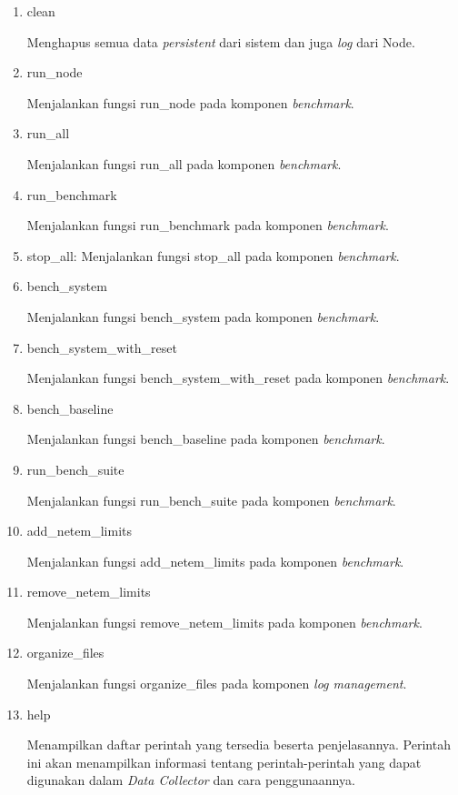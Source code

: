 \begin{enumerate}
  \item clean
  
  Menghapus semua data \textit{persistent} dari sistem dan juga \textit{log} dari Node.
  
  \item run\_node
  
  Menjalankan fungsi run\_node pada komponen \textit{benchmark}.
  
  \item run\_all
  
  Menjalankan fungsi run\_all pada komponen \textit{benchmark}.
  
  \item run\_benchmark
  
  Menjalankan fungsi run\_benchmark pada komponen \textit{benchmark}.
  
  \item stop\_all: Menjalankan fungsi stop\_all pada komponen \textit{benchmark}.
  
  \item bench\_system
  
  Menjalankan fungsi bench\_system pada komponen \textit{benchmark}.
  
  
  \item bench\_system\_with\_reset
  
  Menjalankan fungsi bench\_system\_with\_reset pada komponen \textit{benchmark}.
  
  \item bench\_baseline
  
  Menjalankan fungsi bench\_baseline pada komponen \textit{benchmark}.
  
  \item run\_bench\_suite
  
  Menjalankan fungsi run\_bench\_suite pada komponen \textit{benchmark}.
  
  \item add\_netem\_limits
  
  Menjalankan fungsi add\_netem\_limits pada komponen \textit{benchmark}.
  
  \item remove\_netem\_limits
  
  Menjalankan fungsi remove\_netem\_limits pada komponen \textit{benchmark}.

  \item organize\_files
  
  Menjalankan fungsi organize\_files pada komponen \textit{log management}.
  
  \item help
  
  Menampilkan daftar perintah yang tersedia beserta penjelasannya. Perintah ini akan menampilkan informasi tentang perintah-perintah yang dapat digunakan dalam \textit{Data Collector} dan cara penggunaannya.
\end{enumerate}

